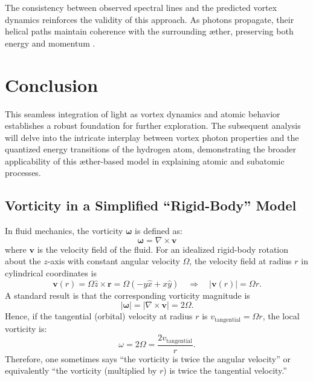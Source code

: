 The consistency between observed spectral lines and the predicted vortex dynamics reinforces the validity of this approach. As photons propagate, their helical paths maintain coherence with the surrounding \ae ther, preserving both energy and momentum \cite{verlinde2010, raymer2007}.

\section{Conclusion}
This seamless integration of light as vortex dynamics and atomic behavior establishes a robust foundation for further exploration. The subsequent analysis will delve into the intricate interplay between vortex photon properties and the quantized energy transitions of the hydrogen atom, demonstrating the broader applicability of this \ae ther-based model in explaining atomic and subatomic processes.




\subsection{Vorticity in a Simplified ``Rigid-Body'' Model}
In fluid mechanics, the vorticity $\boldsymbol{\omega}$ is defined as:
\begin{equation}
    \boldsymbol{\omega} = \nabla \times \mathbf{v}
\end{equation}
where $\mathbf{v}$ is the velocity field of the fluid. For an idealized rigid-body rotation about the $z$-axis with constant angular velocity $\Omega$, the velocity field at radius $r$ in cylindrical coordinates is
\begin{equation}
    \mathbf{v}(r) = \Omega \hat{z} \times \mathbf{r} = \Omega(-y\hat{x} + x\hat{y}) \quad \Rightarrow \quad |
    \mathbf{v}(r)| = \Omega r.
\end{equation}
A standard result is that the corresponding vorticity magnitude is
\begin{equation}
    |\boldsymbol{\omega}| = \left| \nabla \times \mathbf{v} \right| = 2\Omega.
\end{equation}
Hence, if the tangential (orbital) velocity at radius $r$ is $v_\text{tangential} = \Omega r$, the local vorticity is:
\begin{equation}
    \omega = 2\Omega = \frac{2v_\text{tangential}}{r}.
\end{equation}
Therefore, one sometimes says ``the vorticity is twice the angular velocity'' or equivalently ``the vorticity (multiplied by $r$) is twice the tangential velocity.''


